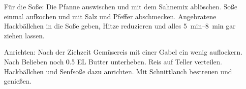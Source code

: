 Für die Soße: Die Pfanne auswischen und mit dem Sahnemix ablöschen. Soße einmal aufkochen und mit Salz und Pfeffer abschmecken. 
Angebratene Hackbällchen in die Soße geben, Hitze reduzieren und alles \SIrange{5}{8}{min} gar ziehen lassen.

Anrichten: Nach der Ziehzeit Gemüsereis mit einer Gabel ein wenig auflockern. Nach Belieben noch \num{0.5} EL Butter unterheben. 
Reis auf Teller verteilen. 
Hackbällchen und Senfsoße dazu anrichten.
Mit Schnittlauch bestreuen und genießen.  